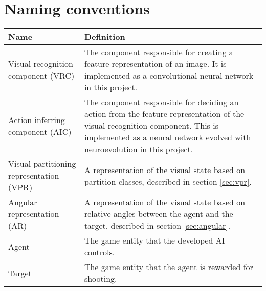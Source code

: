\section{Naming conventions}

\begin{minipage}{\textwidth}
\begin{center}

\label{tab:naming-conventions} 

\begin{tabularx}{\textwidth}{|l|X|}
		\hline
	
		\textbf{Name} & \textbf{Definition} \\ \hline
		Visual recognition component (VRC) & The component responsible for creating a feature representation of an image. It is implemented as a convolutional neural network in this project. \\ \hline
		Action inferring component (AIC) & The component responsible for deciding an action from the feature representation of the visual recognition component. This is implemented as a neural network evolved with neuroevolution in this project. \\ \hline
		Visual partitioning representation (VPR) & A representation of the visual state based on partition classes, described in section \ref{sec:vpr}. \\ \hline
		
		Angular representation (AR) & A representation of the visual state based on relative angles between the agent and the target, described in section \ref{sec:angular}. \\ \hline
		Agent & The game entity that the developed AI controls. \\ \hline
		Target & The game entity that the agent is rewarded for shooting. \\ \hline
		
\end{tabularx}
\end{center}
\end{minipage}

\newpage